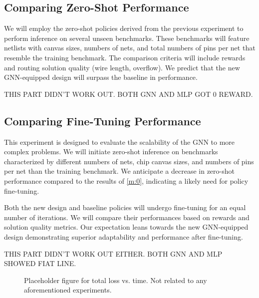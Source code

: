 \documentclass[letterpaper]{article}
\begin{document}
\subsection{Comparing Zero-Shot Performance} \label{m:0}
We will employ the zero-shot policies derived from the previous experiment to perform inference on several unseen benchmarks. These benchmarks will feature netlists with canvas sizes, numbers of nets, and total numbers of pins per net that resemble the training benchmark. The comparison criteria will include rewards and routing solution quality (wire length, overflow). We predict that the new GNN-equipped design will surpass the baseline in performance.

THIS PART DIDN'T WORK OUT. BOTH GNN AND MLP GOT 0 REWARD. 

\subsection{Comparing Fine-Tuning Performance}
This experiment is designed to evaluate the scalability of the GNN to more complex problems. We will initiate zero-shot inference on benchmarks characterized by different numbers of nets, chip canvas sizes, and numbers of pins per net than the training benchmark. We anticipate a decrease in zero-shot performance compared to the results of \autoref{m:0}, indicating a likely need for policy fine-tuning.

Both the new design and baseline policies will undergo fine-tuning for an equal number of iterations. We will compare their performances based on rewards and solution quality metrics. Our expectation leans towards the new GNN-equipped design demonstrating superior adaptability and performance after fine-tuning.

THIS PART DIDN'T WORK OUT EITHER. BOTH GNN AND MLP SHOWED FIAT LINE.

\begin{figure}[h!]
    \centering
    \caption{Placeholder figure for total loss vs. time. Not related to any aforementioned experiments.}
\end{figure}
\end{document}
